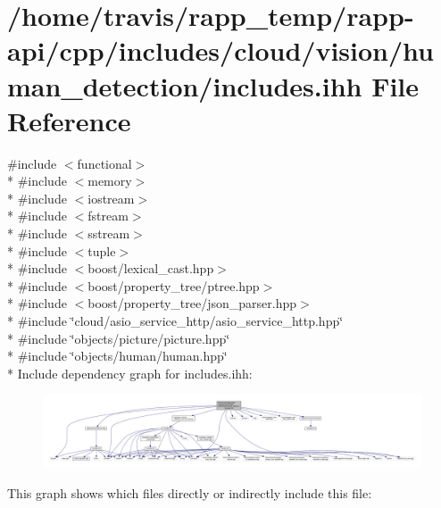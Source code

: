 \hypertarget{cloud_2vision_2human__detection_2includes_8ihh}{\section{/home/travis/rapp\-\_\-temp/rapp-\/api/cpp/includes/cloud/vision/human\-\_\-detection/includes.ihh File Reference}
\label{cloud_2vision_2human__detection_2includes_8ihh}
}
{\ttfamily \#include $<$functional$>$}\\*
{\ttfamily \#include $<$memory$>$}\\*
{\ttfamily \#include $<$iostream$>$}\\*
{\ttfamily \#include $<$fstream$>$}\\*
{\ttfamily \#include $<$sstream$>$}\\*
{\ttfamily \#include $<$tuple$>$}\\*
{\ttfamily \#include $<$boost/lexical\-\_\-cast.\-hpp$>$}\\*
{\ttfamily \#include $<$boost/property\-\_\-tree/ptree.\-hpp$>$}\\*
{\ttfamily \#include $<$boost/property\-\_\-tree/json\-\_\-parser.\-hpp$>$}\\*
{\ttfamily \#include \char`\"{}cloud/asio\-\_\-service\-\_\-http/asio\-\_\-service\-\_\-http.\-hpp\char`\"{}}\\*
{\ttfamily \#include \char`\"{}objects/picture/picture.\-hpp\char`\"{}}\\*
{\ttfamily \#include \char`\"{}objects/human/human.\-hpp\char`\"{}}\\*
Include dependency graph for includes.\-ihh\-:
\nopagebreak
\begin{figure}[H]
\begin{center}
\leavevmode
\includegraphics[width=350pt]{cloud_2vision_2human__detection_2includes_8ihh__incl}
\end{center}
\end{figure}
This graph shows which files directly or indirectly include this file\-:
\nopagebreak
